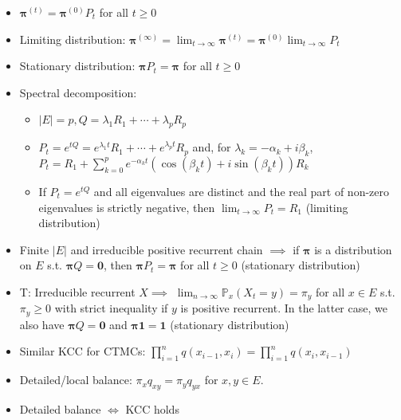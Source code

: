 \begin{itemize}
\begin{itemize}
    \end{itemize}
    \item $\boldsymbol{\pi}^{(t)} = \boldsymbol{\pi}^{(0)}P_t$ for all $t \geq 0$
    \item Limiting distribution: $\boldsymbol{\pi}^{(\infty)} = \displaystyle\lim_{t\to\infty} \boldsymbol{\pi}^{(t)} = \boldsymbol{\pi}^{(0)} \displaystyle\lim_{t\to\infty} P_t$
    \item Stationary distribution: $\boldsymbol{\pi}P_t = \boldsymbol{\pi}$ for all $t \geq 0$
    \item Spectral decomposition:
    \begin{itemize}
        \item $|E| = p, Q = \lambda_1R_1 + \cdots + \lambda_pR_p$
        \item $P_t = e^{tQ} = e^{\lambda_1t} R_1 + \cdots + e^{\lambda_pt}R_p$ and, for $\lambda_k = -\alpha_k + i\beta_k$, \\ $P_t = R_1 + \sum_{k=0}^p e^{-\alpha_k t} \left(\cos(\beta_kt) + i\sin(\beta_kt)\right)R_k$
        \item If $P_t = e^{tQ}$ and all eigenvalues are distinct and the real part of non-zero eigenvalues is strictly negative, then $\lim_{t\to\infty} P_t = R_1$ (limiting distribution)
    \end{itemize}
    \item Finite $|E|$ and irreducible positive recurrent chain $\implies$ if $\boldsymbol{\pi}$ is a distribution on $E$ s.t. $\boldsymbol{\pi}Q = \boldsymbol{0}$, then $\boldsymbol{\pi}P_t = \boldsymbol{\pi}$ for all $t \geq 0$ (stationary distribution)
    \item T: Irreducible recurrent $X \implies$ $\displaystyle\lim_{n\to\infty} \mathbb{P}_x(X_t = y) = \pi_y$ for all $x \in E$ s.t. $\pi_y \geq 0$ with strict inequality if $y$ is positive recurrent. In the latter case, we also have $\boldsymbol{\pi}Q = \boldsymbol{0}$ and $\boldsymbol{\pi1} = \boldsymbol{1}$ (stationary distribution)
    \item Similar KCC for CTMCs: $\prod_{i=1}^n q(x_{i-1}, x_i) = \prod_{i=1}^n q(x_i, x_{i-1})$
    \item Detailed/local balance: $\pi_x q_{xy} = \pi_y q_{yx}$ for $x, y \in E$.
    \item Detailed balance $\iff$ KCC holds
\end{itemize}

